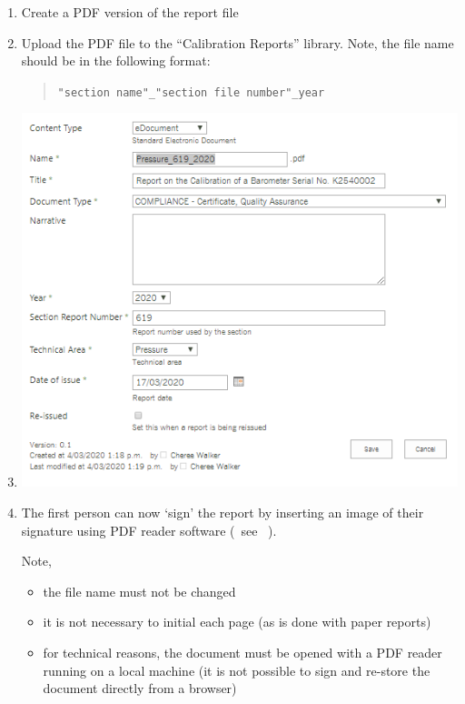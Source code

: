 \begin{enumerate}
\item Create a PDF version of the report file
\item Upload the PDF file to the ``Calibration Reports'' library. Note, the file name should be in the following format:
\begin{quote}
\texttt{"section name"\_"section file number"\_year}
\end{quote}
\item {}
\begin{center}
\includegraphics[scale=.9]{pictures/metadata_signed_report}
\end{center}
\item The first person can now `sign' the report by inserting an image of their signature using PDF reader software (~see \cite[\S\ref*{GRP-ss:electronic_reports}]{MSL_Reporting_Guidelines}~). 

Note,
\begin{itemize}
\item the file name must not be changed 
\item it is not necessary to initial each page (as is done with paper reports)
\item for technical reasons, the document must be opened with a PDF reader running on a local machine (it is not possible to sign and re-store the document directly from a browser)
\end{itemize}


\end{enumerate}
